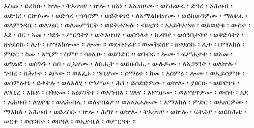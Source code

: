 \clearpage
\begin{ethiopictext}
    እስመ ፡ ይረስዑ ፡ ኵሎ ፡ ትእዛዝየ ፡ 
    ኵሎ ፡ ዘአነ ፡ እኤዝዞሙ ፡ ወየሐውሩ ፡ ድኅረ ፡ አሕዛብ ፡ ወድኅረ ፡
    ርኵሶሙ ፡ ወድኅረ ፡ ኀሳሮም ፡ ወይትቀነዩ ፡ ለአማልክቲሆሙ ፡ 
    ወይከውንዎሙ ፡ ማዕቀፈ ፡ ወለምንዳቤ ፡ ወለፃዕር ፡ ወለመሥገርት ፡
    ወይትሐጐሉ ፡ ብዙኃን ፡ ኣአይትአኀዙ ፡ ወይወድቁ ፡ ውስተ ፡
    እደ ፡ ፀር ፡ ኣመ ፡ ኀደጉ ፡ ሥርዓትየ ፡ ወትእዛዝየ ፡ ወበዓላተ ፡
    ኪዳንየ ፡ ወሰንበታትየ ፡ ወቅድሳትየ ፡ ዘቀደስኩ ፡ ሊተ ፡ በማእከሎሙ ።
    ሎሙ ። ወደብተራየ ፡ ወመቅደስየ ፡ ዘቀደስኩ ፡ ሊተ ፡ በማእከለ ፡
    ምድር ፡ ከመ ፡ እሢም ፡ ስምየ ፡ ሳዕሌሁ ፡ ወይንድር ።
    ወገብሩ ፡
    ሎሙ ፡ ፍሥሐታተ ፡ ወኦመ ፡ ወግልፎ : ወሰገዱ ፡ ሰሰ ፡ ዚአሆሙ ፡ 
    ለስሒት ፡ ወይዘብሑ ፡ ውሉዶሙ ፡ ለአጋንንት ፡ ወለኵሉ ፡ ግብረ ፡
    ስሕተተ ፡ ልቦሙ ።
    ወእፌኑ ፡ ኀቤሆሙ ፡ ሰማዕተ ፡ ከመ ፡
    አስምዕ ፡ ሎሙ ፡ ወኢይሰምዑ ፡ ወሰምዕተኒ ፡ ይቀትሉ ፡ ወለእለሂ ፡
    የኀሥሡ ፡ ሕገ ፡ ይሰድድዎሙ ፡ ወኵሎ ፡ ያፀርዑ ፡ ወይዌጥኑ ፡ ለገቢረ ፡
    እኩይ ፡ በቅድመ ፡ አዕይንትየ ፡
    ወአኀብእ ፡ ገጽየ ፡
    እምኔቦሙ ፡ ወእሜጥዎሙ ፡ ውስተ ፡ እደ ፡ አሕዛብ ፡ ለፂዋዌ ፡
    ወለሕብሌ ፡ ወለተበልዖ ። ወአኣኤኣሎሙ ፡ እማእከለ ፡ ምድር ፡
    ወእዘርዎሙ ፡ ማእከለ ፡ አሕዛብ ፡
    ወይረስዑ ፡ ኵሎ ፡ ሕግየ ፡
    ወኵሎ ፡ ትእዛዝየ ፡ ወኵሎ ፡ ፍትሕየ ፡ ወይስሕቱ ፡ ሠርቀ ፡ ወሰንበተ ፡
    ወበዓለ ፡ ወኢዮቤለ ፡ ወሥርዓተ ።
\end{ethiopictext}

